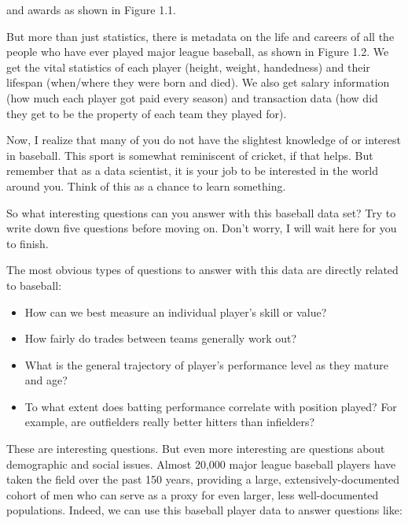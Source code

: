 \documentclass[10pt]{article}
\begin{document}
and awards as shown in Figure 1.1.

But more than just statistics, there is metadata on the life and careers of all the people who have ever played major league baseball, as shown in Figure 1.2. We get the vital statistics of each player (height, weight, handedness) and their lifespan (when/where they were born and died). We also get salary information (how much each player got paid every season) and transaction data (how did they get to be the property of each team they played for).

Now, I realize that many of you do not have the slightest knowledge of or interest in baseball. This sport is somewhat reminiscent of cricket, if that helps. But remember that as a data scientist, it is your job to be interested in the world around you. Think of this as a chance to learn something.

So what interesting questions can you answer with this baseball data set? Try to write down five questions before moving on. Don't worry, I will wait here for you to finish.

The most obvious types of questions to answer with this data are directly related to baseball:

\begin{itemize}
  \item How can we best measure an individual player's skill or value?
  \item How fairly do trades between teams generally work out?
  \item What is the general trajectory of player's performance level as they mature and age?
  \item To what extent does batting performance correlate with position played? For example, are outfielders really better hitters than infielders?
\end{itemize}

These are interesting questions. But even more interesting are questions about demographic and social issues. Almost 20,000 major league baseball players have taken the field over the past 150 years, providing a large, extensively-documented cohort of men who can serve as a proxy for even larger, less well-documented populations. Indeed, we can use this baseball player data to answer questions like:
\end{document}
